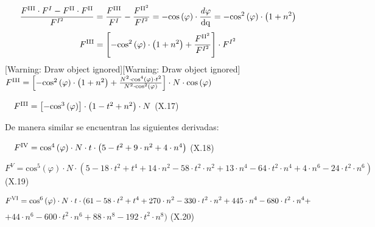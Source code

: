\documentclass{tufte-book}
\newcommand\normalsubformula[1]{\text{\mathversion{normal}$#1$}}
\begin{document}
\begin{equation*}
{\frac{F^{{\normalsubformula{\text{III}}}}\cdot
F^{{I}}-F^{{\normalsubformula{\text{II}}}}\cdot
F^{{\normalsubformula{\text{II}}}}}{F^{{I}^{{2}}}}=\frac{F^{{\normalsubformula{\text{III}}}}}{F^{{I}}}-\frac{F^{{\normalsubformula{\text{II}}}^{{2}}}}{F^{{I}^{{2}}}}=-\text{cos}\left(\varphi
\right)\cdot {\frac{\mathit{d\varphi
}}{\normalsubformula{\text{dq}}}}=-\text{cos}^{{2}}\left(\varphi
\right)\cdot \left(1+n^{{2}}\right)}
\end{equation*}
\begin{equation*}
{F^{{\normalsubformula{\text{III}}}}=\left[-\text{cos}^{{2}}\left(\varphi
\right)\cdot
\left(1+n^{{2}}\right)+\frac{F^{{\normalsubformula{\text{II}}}^{{2}}}}{F^{{I}^{{2}}}}\right]\cdot
F^{{I}^{{2}}}}
\end{equation*}
[Warning: Draw object ignored][Warning: Draw object ignored]\ \ 
${F^{{\normalsubformula{\text{III}}}}=\left[-\text{cos}^{{2}}\left(\varphi
\right)\cdot \left(1+n^{{2}}\right)+\frac{N^{{2}}\cdot
\text{cos}^{{4}}\left(\varphi \right)\cdot t^{{2}}}{N^{{2}}\cdot
\text{cos}^{{2}}\left(\varphi \right)}\right]\cdot N\cdot
\text{cos}\left(\varphi \right)}$

\ \ 
${F^{{\normalsubformula{\text{III}}}}=\left[-\text{cos}^{{3}}\left(\varphi
\right)\right]\cdot \left(1-t^{{2}}+n^{{2}}\right)\cdot N}$  (X.17)

De manera similar se encuentran las siguientes derivadas:

\ \  ${F^{{\normalsubformula{\text{IV}}}}=\text{cos}^{{4}}\left(\varphi
\right)\cdot N\cdot t\cdot \left(5-t^{{2}}+9\cdot n^{{2}}+4\cdot
n^{{4}}\right)}$  (X.18)

 ${F^{{V}}=\text{cos}^{{5}}\left(\varphi \right)\cdot N\cdot
\left(5-\text{18}\cdot t^{{2}}+t^{{4}}+\text{14}\cdot
n^{{2}}-\text{58}\cdot t^{{2}}\cdot n^{{2}}+\text{13}\cdot
n^{{4}}-\text{64}\cdot t^{{2}}\cdot n^{{4}}+4\cdot
n^{{6}}-\text{24}\cdot t^{{2}}\cdot n^{{6}}\right)}$ (X.19)

\begin{equation*}
{F^{{\normalsubformula{\text{VI}}}}=\text{cos}^{{6}}\left(\varphi
\right)\cdot N\cdot t\cdot (\text{61}-\text{58}\cdot
t^{{2}}+t^{{4}}+\text{270}\cdot n^{{2}}-\text{330}\cdot t^{{2}}\cdot
n^{{2}}+\text{445}\cdot n^{{4}}-\text{680}\cdot t^{{2}}\cdot n^{{4}}+}
\end{equation*}
 ${+\text{44}\cdot n^{{6}}-\text{600}\cdot t^{{2}}\cdot
n^{{6}}+\text{88}\cdot n^{{8}}-\text{192}\cdot t^{{2}}\cdot n^{{8}})}$ 
(X.20)
\end{document}
